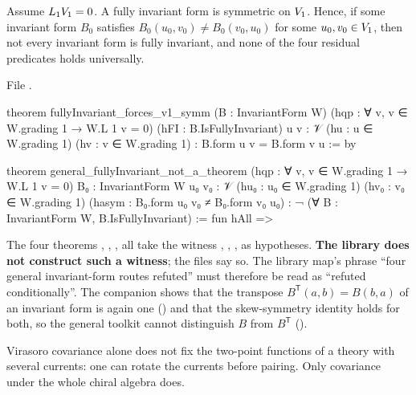 \begin{theorem}\label{l04:thm:delim}
Assume $L_1V_1 = 0$. A fully invariant form is symmetric on $V_1$. Hence, if some invariant form
$B_0$ satisfies $B_0(u_0,v_0)\ne B_0(v_0,u_0)$ for some $u_0,v_0\in V_1$, then not every invariant form is
fully invariant, and none of the four residual predicates holds universally.
\end{theorem}
\noindent File .
\begin{leancode}
theorem fullyInvariant_forces_v1_symm (B : InvariantForm W)
    (hqp : ∀ v, v ∈ W.grading 1 → W.L 1 v = 0)
    (hFI : B.IsFullyInvariant) {u v : 𝒱} (hu : u ∈ W.grading 1) (hv : v ∈ W.grading 1) :
    B.form u v = B.form v u := by

theorem general_fullyInvariant_not_a_theorem
    (hqp : ∀ v, v ∈ W.grading 1 → W.L 1 v = 0)
    {B₀ : InvariantForm W} {u₀ v₀ : 𝒱} (hu₀ : u₀ ∈ W.grading 1) (hv₀ : v₀ ∈ W.grading 1)
    (hasym : B₀.form u₀ v₀ ≠ B₀.form v₀ u₀) :
    ¬ (∀ B : InvariantForm W, B.IsFullyInvariant) := fun hAll =>
\end{leancode}
\begin{dictionary}
The four theorems \allowbreak{}\allowbreak{}\allowbreak{}\allowbreak{}, \allowbreak{}\allowbreak{}\allowbreak{}\allowbreak{},
\allowbreak{}\allowbreak{}\allowbreak{}\allowbreak{}, \allowbreak{}\allowbreak{}\allowbreak{}\allowbreak{} all take the witness
, , ,  as hypotheses. \textbf{The library does not construct
such a witness}; the files say so. The library map's phrase ``four general invariant-form routes refuted''
must therefore be read as ``refuted conditionally''. The companion 
shows that the transpose $B^{\mathsf T}(a,b) = B(b,a)$ of an invariant form is again one
(\allowbreak{}) and that the skew-symmetry identity  holds for both,
so the general toolkit cannot distinguish $B$ from $B^{\mathsf T}$
(\allowbreak{}\allowbreak{}\allowbreak{}\allowbreak{}\allowbreak{}).
\end{dictionary}
\begin{physics}
Virasoro covariance alone does not fix the two-point functions of a theory with several currents: one can
rotate the currents before pairing. Only covariance under the whole chiral algebra does.
\end{physics}
